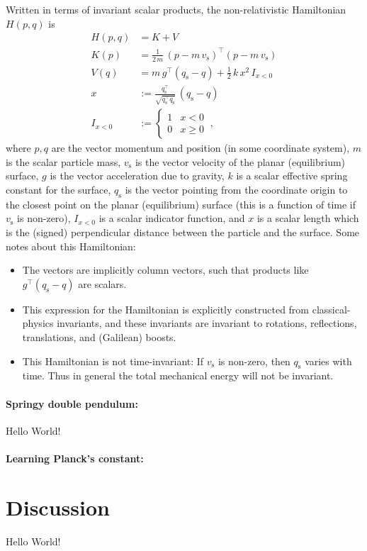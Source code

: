 \documentclass[12pt]{article}
\newcommand{\T}{^\top}
\newcommand{\surf}{{\mathrm{s}}}
\begin{document}
Written in terms of invariant scalar products, the non-relativistic Hamiltonian $H(p,q)$ is
\begin{align}
    H(p,q) &= K + V \\
    K(p) &= \frac{1}{2\,m}\,(p - m\,v_\surf)\T (p - m\,v_\surf) \\
    V(q) &= m\,g\T (q_\surf - q) + \frac{1}{2}\,k\,x^2\,I_{x<0} \\
    x &:= \frac{q_\surf\T}{\sqrt{q_\surf\T q_\surf}}\,(q_\surf - q) \\
    I_{x<0} &:= \left\{\begin{array}{cl} 1 & x < 0 \\ 0 & x \geq 0\end{array}\right. ~,
\end{align}
where $p,q$ are the vector momentum and position (in some coordinate system), $m$ is the scalar particle mass, $v_\surf$ is the vector velocity of the planar (equilibrium) surface, $g$ is the vector acceleration due to gravity, $k$ is a scalar effective spring constant for the surface, $q_\surf$ is the vector pointing from the coordinate origin to the closest point on the planar (equilibrium) surface (this is a function of time if $v_\surf$ is non-zero), $I_{x<0}$ is a scalar indicator function, and $x$ is a scalar length which is the (signed) perpendicular distance between the particle and the surface.
Some notes about this Hamiltonian:
\begin{itemize}
  \item The vectors are implicitly column vectors, such that products like $g\T (q_\surf - q)$ are scalars.
  \item This expression for the Hamiltonian is explicitly constructed from classical-physics invariants, and these invariants are invariant to rotations, reflections, translations, and (Galilean) boosts.
  \item This Hamiltonian is not time-invariant: If $v_\surf$ is non-zero, then $q_\surf$ varies with time. Thus in general the total mechanical energy will not be invariant.
\end{itemize}

\paragraph{Springy double pendulum:}
Hello World!


\paragraph{Learning Planck's constant:}

\section{Discussion}

Hello World!


\raggedright

\end{document}
